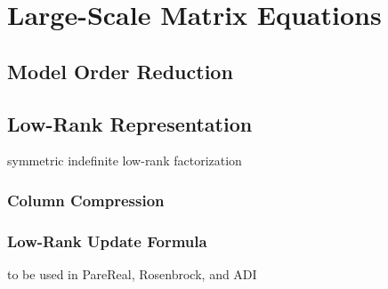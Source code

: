 \chapter{Large-Scale Matrix Equations}

\section{Model Order Reduction}
\section{Low-Rank Representation}
symmetric indefinite low-rank factorization
\subsection{Column Compression}
\subsection{Low-Rank Update Formula}
to be used in PareReal, Rosenbrock, and ADI
